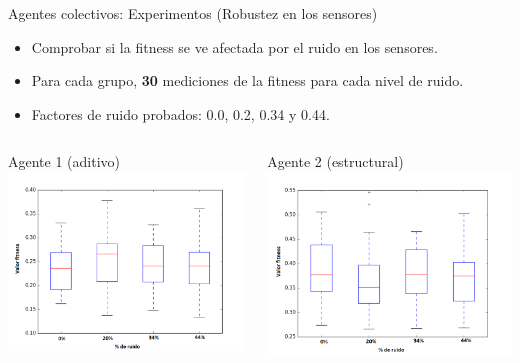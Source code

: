 \documentclass[aspectratio=169]{beamer}
\begin{document}
\begin{frame}{Agentes colectivos: Experimentos (Robustez en los sensores)}
  \begin{itemize}
    \item Comprobar si la fitness se ve afectada por el ruido en los sensores.
    \item Para cada grupo, \textbf{30} mediciones de la fitness para cada nivel de ruido.
    \item Factores de ruido probados: 0.0, 0.2, 0.34 y 0.44.
  \end{itemize}
  \begin{columns}
    \begin{column}{0.47\textwidth}
      \begin{block}{Agente 1 (aditivo)}
      \includegraphics[width=1.0\textwidth,height=.6\textheight]{Imagenes/BoxPlot1}
    \end{block}
    \end{column}
    \begin{column}{0.5\textwidth}
      \begin{block}{Agente 2 (estructural)}
      \includegraphics[width=1.0\textwidth,height=.6\textheight]{Imagenes/BoxPlot2}

\end{block}
\end{column}
\end{columns}
\end{frame}
\end{document}
